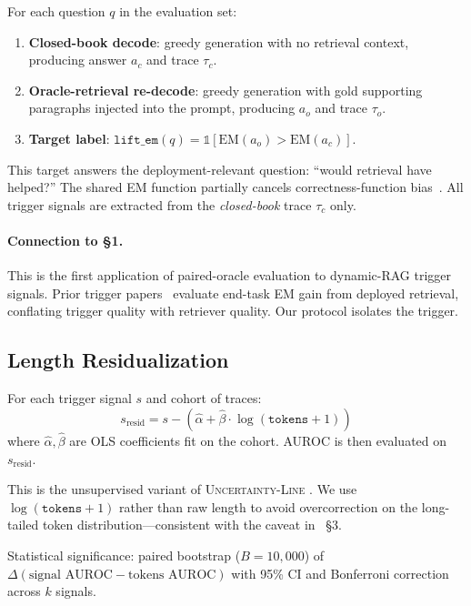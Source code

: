 \documentclass[11pt]{article}
\begin{document}
For each question $q$ in the evaluation set:
\begin{enumerate}
\item \textbf{Closed-book decode}: greedy generation with no
retrieval context, producing answer $a_c$ and trace $\tau_c$.
\item \textbf{Oracle-retrieval re-decode}: greedy generation with
gold supporting paragraphs injected into the prompt, producing
$a_o$ and trace $\tau_o$.
\item \textbf{Target label}:
$\texttt{lift\_em}(q) = \mathbb{1}[\text{EM}(a_o) >
\text{EM}(a_c)]$.
\end{enumerate}

This target answers the deployment-relevant question: ``would
retrieval have helped?'' The shared EM function partially cancels
correctness-function bias~\citep{Ielanskyi_PitfallsUQEvaluationNLG}.
All trigger signals are extracted from the \emph{closed-book} trace
$\tau_c$ only.

\paragraph{Connection to \S1.} This is the first application of
paired-oracle evaluation to dynamic-RAG trigger signals. Prior
trigger papers~\citep{Su_DRAGIN, Jiang_FLARE, Yao_SeaKR} evaluate
end-task EM gain from deployed retrieval, conflating trigger quality
with retriever quality. Our protocol isolates the trigger.


\subsection{Length Residualization}

For each trigger signal $s$ and cohort of traces:
\[
s_{\text{resid}} = s - (\hat{\alpha} + \hat{\beta} \cdot
\log(\texttt{tokens} + 1))
\]
where $\hat{\alpha}, \hat{\beta}$ are OLS coefficients fit on the
cohort. AUROC is then evaluated on $s_{\text{resid}}$.

This is the unsupervised variant of \textsc{Uncertainty-Line}
\citep{Vashurin_UncertaintyLineLengthInvariant}. We use
$\log(\texttt{tokens}+1)$ rather than raw length to avoid
overcorrection on the long-tailed token distribution---consistent
with the caveat in~\cite{Vashurin_UncertaintyLineLengthInvariant}
\S3.

Statistical significance: paired bootstrap ($B{=}10{,}000$) of
$\Delta(\text{signal AUROC} - \text{tokens AUROC})$ with 95\% CI
and Bonferroni correction across $k$ signals.
\end{document}
